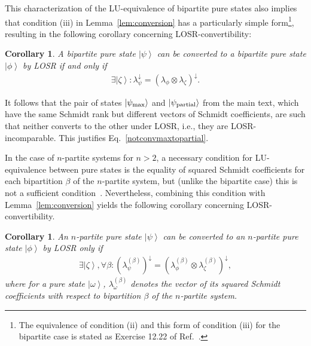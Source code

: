 \documentclass[12pt]{article}
\newcommand{\ket}[1]{\left| #1 \right>}
\theoremstyle{plain}
\newtheorem{cor}[theo]{Corollary}
\theoremstyle{definition}
\begin{document}
This characterization of the LU-equivalence of bipartite pure states also implies that condition (iii) in Lemma~\ref{lem:conversion} has a particularly simple form\footnote{The equivalence of condition (ii) and this form of condition (iii) for the bipartite case is stated as Exercise 12.22 of Ref.~\cite{NielsenAndChuang}.}, resulting in the following corollary concerning LOSR-convertibility:
\begin{cor}
    \label{cor:bipartite}
    A bipartite pure state $\ket{\psi}$ can be converted to a bipartite pure state $\ket{\phi}$ by LOSR if and only if
    \begin{align}
    \label{eq:bipartite_extension}
    \exists \ket \zeta: \lambda_{\psi}^{\downarrow} = (\lambda_{\phi} \otimes \lambda_{\zeta})^{\downarrow}.
    \end{align}
 \end{cor}

It follows that the pair of states $|\psi_{\rm max}\rangle$ and $|\psi_{\rm partial}\rangle$ from the main text, which have the same Schmidt rank but different vectors of Schmidt coefficients, are such that neither converts to the other under LOSR, i.e., they are LOSR-incomparable. This justifies Eq.~\eqref{notconvmaxtopartial}.


In the case of $n$-partite systems for $n>2$, a necessary condition for LU-equivalence between pure states is
the equality of squared Schmidt coefficients for each bipartition $\beta$ of the $n$-partite system, but (unlike the bipartite case) this is not a sufficient condition~\cite{Kraus2010Local,Acin2001puretriclassify}. 
Nevertheless, combining this condition with Lemma~\ref{lem:conversion} yields the following corollary concerning LOSR-convertibility.


\begin{cor}
    \label{cor:multipartite_extension}
    An $n$-partite pure state $\ket{\psi}$ can be converted to an $n$-partite pure state $\ket{\phi}$ by LOSR only if
    \begin{align}
        \label{eq:multipartite_extension}
\exists \ket \zeta, \forall \beta : (\lambda^{(\beta)}_{\psi})^{\downarrow} = (\lambda^{(\beta)}_{\phi} \otimes \lambda^{(\beta)}_{\zeta})^{\downarrow},
    \end{align}
    where for a pure state $\ket{\omega}$, $\lambda^{(\beta)}_{\omega}$ denotes the vector of its squared Schmidt coefficients 
    with respect to bipartition $\beta$ of the $n$-partite system.
\end{cor}
\end{document}
